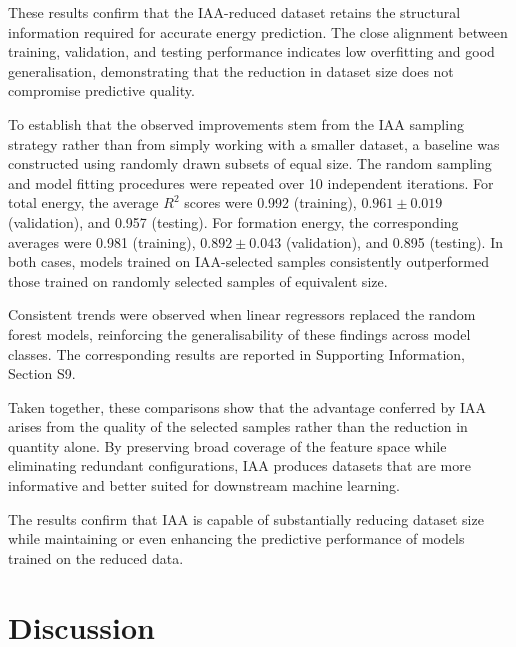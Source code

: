 \documentclass{WileyMSP-template}
\begin{document}
These results confirm that the IAA-reduced dataset retains the structural information required for accurate energy prediction. The close alignment between training, validation, and testing performance indicates low overfitting and good generalisation, demonstrating that the reduction in dataset size does not compromise predictive quality.

To establish that the observed improvements stem from the IAA sampling strategy rather than from simply working with a smaller dataset, a baseline was constructed using randomly drawn subsets of equal size. The random sampling and model fitting procedures were repeated over 10 independent iterations. For total energy, the average $R^2$ scores were 0.992 (training), $0.961 \pm 0.019$ (validation), and 0.957 (testing). For formation energy, the corresponding averages were 0.981 (training), $0.892 \pm 0.043$ (validation), and 0.895 (testing). In both cases, models trained on IAA-selected samples consistently outperformed those trained on randomly selected samples of equivalent size.

Consistent trends were observed when linear regressors replaced the random forest models, reinforcing the generalisability of these findings across model classes. The corresponding results are reported in Supporting Information, Section S9.

Taken together, these comparisons show that the advantage conferred by IAA arises from the quality of the selected samples rather than the reduction in quantity alone. By preserving broad coverage of the feature space while eliminating redundant configurations, IAA produces datasets that are more informative and better suited for downstream machine learning.

The results confirm that IAA is capable of substantially reducing dataset size while maintaining or even enhancing the predictive performance of models trained on the reduced data.



\section{Discussion}
\label{sec:discussion}
\end{document}
